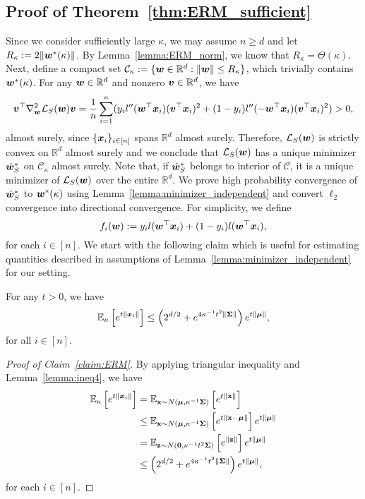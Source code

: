 \subsection{Proof of Theorem~\ref{thm:ERM_sufficient}} \label{proof:ERM_sufficient}
Since we consider sufficiently large $\kappa$, we may assume $n \geq d$
and let $R_\kappa:=2 \lVert {\bm{w}}^*(\kappa) \rVert$. By Lemma~\ref{lemma:ERM_norm}, we know that $R_\kappa = \Theta(\kappa)$. Next, define a compact set $\mathcal{C}_\kappa := \{ {\bm{w}} \in \mathbb{R}^d : \lVert {\bm{w}} \rVert \leq R_\kappa\}$, which trivially contains ${\bm{w}}^*(\kappa)$. For any ${\bm{w}} \in \mathbb{R}^d$ and nonzero ${\bm{v}} \in \mathbb{R}^d$, we have
\begin{equation*}
    {\bm{v}}^\top \nabla^2_{\bm{w}} \mathcal{L}_S ({\bm{w}}) {\bm{v}} = \frac{1}{n} \sum_{i=1}^n (y_i l''({\bm{w}}^\top {\bm{x}}_i) ({\bm{v}}^\top {\bm{x}}_i)^2 + (1-y_i) l''(-{\bm{w}}^\top {\bm{x}}_i) ({\bm{v}}^\top {\bm{x}}_i)^2 ) >0,
\end{equation*}
almost surely, since $\{{\bm{x}}_i\}_{i \in [n] }$ spans $\mathbb{R}^d$ almost surely.  Therefore, $\mathcal{L}_S({\bm{w}})$ is strictly convex on $\mathbb{R}^d$ almost surely and we conclude that  $\mathcal{L}_S ({\bm{w}})$ has a unique minimizer $\hat{{\bm{w}}}_{S}^*$ on $\mathcal{C}_\kappa$ almost surely. Note that, if $\hat{{\bm{w}}}_S^*$ belongs to interior of $\mathcal{C}$, it is a unique minimizer of $\mathcal{L}_S ({\bm{w}})$ over the entire $\mathbb{R}^d$. We prove high probability convergence of $\hat{{\bm{w}}}_{S}^*$ to ${\bm{w}}^*(\kappa)$ using Lemma~\ref{lemma:minimizer_independent} and convert $\ell_2$ convergence into directional convergence. 
For simplicity, we define
\begin{equation*}
f_i({\bm{w}}) := y_il({\bm{w}}^\top {\bm{x}}_i) + (1-y_i) l({\bm{w}}^\top {\bm{x}}_i),
\end{equation*}
for each $i \in [n]$.
We start with the following claim which is useful for estimating quantities described in assumptions of Lemma~\ref{lemma:minimizer_independent} for our setting.
\begin{claim}\label{claim:ERM}
For any $t>0$, we have
\begin{equation*}
    \mathbb{E}_\kappa \left[ e^{t\lVert {\bm{x}} _i \rVert}\right] \leq  \left( 2^{d/2} + e^{4\kappa^{-1}t^2 \lVert {\bm{\Sigma}} \rVert}\right)e^{t\lVert {\bm{\mu}} \rVert},
\end{equation*}
for all $i \in [n] $.
\end{claim}
\begin{proof}[Proof of Claim~\ref{claim:ERM}]
By applying triangular inequality and Lemma~\ref{lemma:ineq4}, we have
\begin{align*}
\mathbb{E}_\kappa \left[ e^{t \left \lVert {\bm{x}} _i\right \rVert} \right] &= \mathbb{E}_{{\mathbf{x}} \sim N({\bm{\mu}}, \kappa^{-1} {\bm{\Sigma}}) } \left[ e^{t \left \lVert {\mathbf{x}}\right \rVert} \right]\\
&\leq \mathbb{E}_{{\mathbf{x}} \sim N({\bm{\mu}}, \kappa^{-1} {\bm{\Sigma}}) } \left[ e^{t \left \lVert {\mathbf{x}} - {\bm{\mu}} \right \rVert} \right] e^{t\lVert {\bm{\mu}} \rVert}\\
&= \mathbb{E}_{{\mathbf{z}} \sim N({\bm{0}}, \kappa^{-1}t^2 {\bm{\Sigma}} )} \left[e^{\lVert {\mathbf{z}} \rVert} \right] e^{t\lVert {\bm{\mu}} \rVert} \\
&\leq \left( 2^{d/2} + e^{4\kappa^{-1}t^2 \lVert {\bm{\Sigma}} \rVert}\right)e^{t\lVert {\bm{\mu}} \rVert},
\end{align*}
for each $i \in [n]$.
\end{proof}


